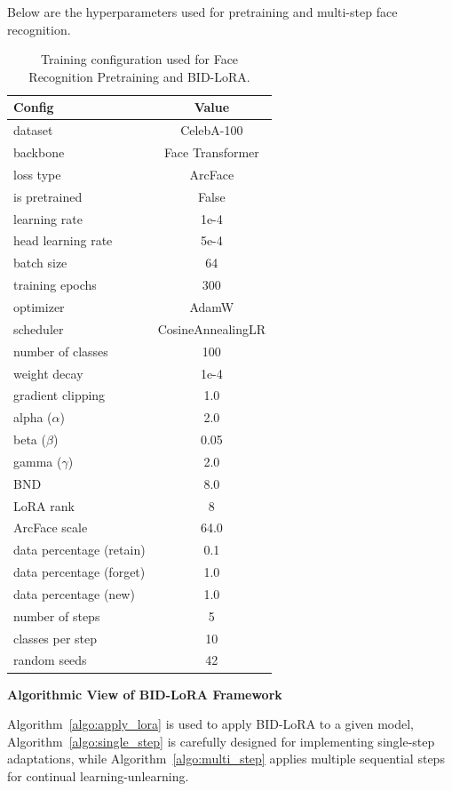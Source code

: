 Below are the hyperparameters used for pretraining and multi-step face recognition.
\begin{table}[h!]
\centering
\begin{tabular}{l|c}
\textbf{Config} & \textbf{Value} \\
\hline
dataset           & CelebA-100 \cite{zhao2024continual}\\
backbone          & Face Transformer \cite{zhong2021face} \\
loss type         & ArcFace \\
is pretrained     & False \\
learning rate     & 1e-4 \\
head learning rate & 5e-4 \\
batch size        & 64 \\
training epochs   & 300 \\
optimizer         & AdamW \\
scheduler         & CosineAnnealingLR \\
number of classes & 100 \\
weight decay      & 1e-4 \\
gradient clipping & 1.0 \\
alpha ($\alpha$)  & 2.0 \\
beta ($\beta$)  & 0.05 \\
gamma ($\gamma$)  & 2.0 \\
BND               & 8.0 \\
LoRA rank         & 8 \\
ArcFace scale     & 64.0 \\
data percentage (retain) & 0.1 \\
data percentage (forget) & 1.0 \\
data percentage (new) & 1.0 \\
number of steps   & 5 \\
classes per step  & 10 \\
random seeds      & 42 \\
\end{tabular}
\caption{Training configuration used for Face Recognition Pretraining and BID-LoRA.}
\label{tab:impl-details-face}
\end{table}


\noindent
\textbf{Algorithmic View of BID-LoRA Framework}

Algorithm~\ref{algo:apply_lora} is used to apply BID-LoRA to a given model, Algorithm~\ref{algo:single_step} is carefully designed for implementing single-step adaptations, while Algorithm~\ref{algo:multi_step} applies multiple sequential steps for continual learning-unlearning.


